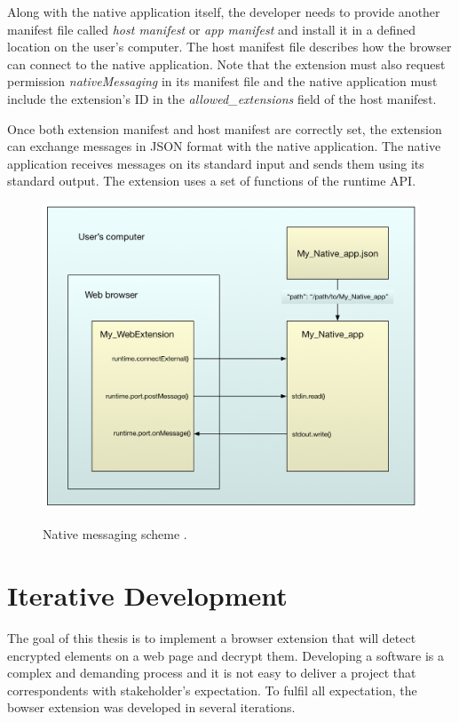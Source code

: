 Along with the native application itself, the developer needs to provide another manifest file called \textit{host manifest} or \textit{app manifest} and install it in a defined location on the user's computer. The host manifest file describes how the browser can connect to the native application. Note that the extension must also request permission \textit{nativeMessaging} in its manifest file and the native application must include the extension's ID in the \textit{allowed\_extensions} field of the host manifest.

Once both extension manifest and host manifest are correctly set, the extension can exchange messages in JSON format with the native application. The native application receives messages on its standard input and sends them using its standard output. The extension uses a set of functions of the runtime API.

\begin{figure}[H]
    \begin{center}
        \label{img:extensionAnatomy}
        \includegraphics[width=1.0\textwidth]{obrazky-figures/native-messaging.png}
        \caption{Native messaging scheme \cite{extensionNativeMessaging}.}
    \end{center}
\end{figure}

\chapter{Iterative Development}
The goal of this thesis is to implement a browser extension that will detect encrypted elements on a web page and decrypt them. Developing a software is a complex and demanding process and it is not easy to deliver a project that correspondents with stakeholder's expectation. To fulfil all expectation, the bowser extension was developed in several iterations.

